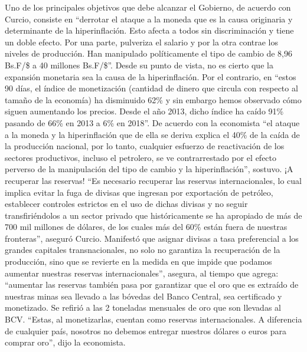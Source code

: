 \documentclass{article}%
\begin{document}
%
Uno de los principales objetivos que debe alcanzar el Gobierno, de acuerdo con Curcio, consiste en “derrotar el ataque a la moneda que es la causa originaria y determinante de la hiperinflación. Esto afecta a todos sin discriminación y tiene un doble efecto. Por una parte, pulveriza el salario y por la otra contrae los niveles de producción. Han manipulado políticamente el tipo de cambio de 8,96 Bs.F/\$ a 40 millones Bs.F/\$”.%
\newline%
%
Desde su punto de vista, no es cierto que la expansión monetaria sea la causa de la hiperinflación. Por el contrario, en “estos 90 días, el índice de monetización (cantidad de dinero que circula con respecto al tamaño de la economía) ha disminuido 62\% y sin embargo hemos observado cómo siguen aumentando los precios. Desde el año 2013, dicho índice ha caído 91\% pasando de 66\% en 2013 a 6\% en 2018”.%
\newline%
%
De acuerdo con la economista “el ataque a la moneda y la hiperinflación que de ella se deriva explica el 40\% de la caída de la producción nacional, por lo tanto, cualquier esfuerzo de reactivación de los sectores productivos, incluso el petrolero, se ve contrarrestado por el efecto perverso de la manipulación del tipo de cambio y la hiperinflación”, sostuvo.%
\newline%
%
¡A recuperar las reservas!%
\newline%
%
“Es necesario recuperar las reservas internacionales, lo cual implica evitar la fuga de divisas que ingresan por exportación de petróleo, establecer controles estrictos en el uso de dichas divisas y no seguir transfiriéndolos a un sector privado que históricamente se ha apropiado de más de 700 mil millones de dólares, de los cuales más del 60\% están fuera de nuestras fronteras”, aseguró Curcio.%
\newline%
%
Manifestó que asignar divisas a tasa preferencial a los grandes capitales transnacionales, no solo no garantiza la recuperación de la producción, sino que se revierte en la medida en que impide que podamos aumentar nuestras reservas internacionales”, asegura, al tiempo que agrega: “aumentar las reservas también pasa por garantizar que el oro que es extraído de nuestras minas sea llevado a las bóvedas del Banco Central, sea certificado y monetizado.%
\newline%
%
Se refirió a las 2 toneladas mensuales de oro que son llevadas al BCV. “Estas, al monetizarlas, cuentan como reservas internacionales. A diferencia de cualquier país, nosotros no debemos entregar nuestros dólares o euros para comprar oro”, dijo la economista.%
\newline%
%
\end{document}
